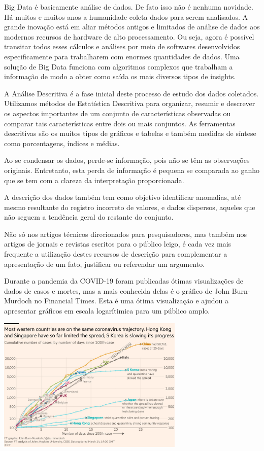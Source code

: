 \documentclass[
]{book}
\begin{document}
Big Data é basicamente análise de dados. De fato isso não é nenhuma novidade. Há muitos e muitos anos a humanidade coleta dados para serem analisados. A grande inovação está em aliar métodos antigos e limitados de análise de dados aos modernos recursos de hardware de alto processamento. Ou seja, agora é possível transitar todos esses cálculos e análises por meio de softwares desenvolvidos especificamente para trabalharem com enormes quantidades de dados. Uma solução de Big Data funciona com algoritmos complexos que trabalham a informação de modo a obter como saída os mais diversos tipos de insights.

A Análise Descritiva é a fase inicial deste processo de estudo dos dados coletados. Utilizamos métodos de Estatística Descritiva para organizar, resumir e descrever os aspectos importantes de um conjunto de características observadas ou comparar tais características entre dois ou mais conjuntos. As ferramentas descritivas são os muitos tipos de gráficos e tabelas e também medidas de síntese como porcentagens, índices e médias.

Ao se condensar os dados, perde-se informação, pois não se têm as observações originais. Entretanto, esta perda de informação é pequena se comparada ao ganho que se tem com a clareza da interpretação proporcionada.

A descrição dos dados também tem como objetivo identificar anomalias, até mesmo resultante do registro incorreto de valores, e dados dispersos, aqueles que não seguem a tendência geral do restante do conjunto.

Não só nos artigos técnicos direcionados para pesquisadores, mas também nos artigos de jornais e revistas escritos para o público leigo, é cada vez mais frequente a utilização destes recursos de descrição para complementar a apresentação de um fato, justificar ou referendar um argumento.

Durante a pandemia da COVID-19 foram publicadas ótimas visualizações de dados de casos e mortes, mas a mais conhecida delas é o gráfico de John Burn-Murdoch no Financial Times. Esta é uma ótima visualização e ajudou a apresentar gráficos em escala logarítimica para um público amplo.

\includegraphics[width=3.5in]{financial_times}
\end{document}
